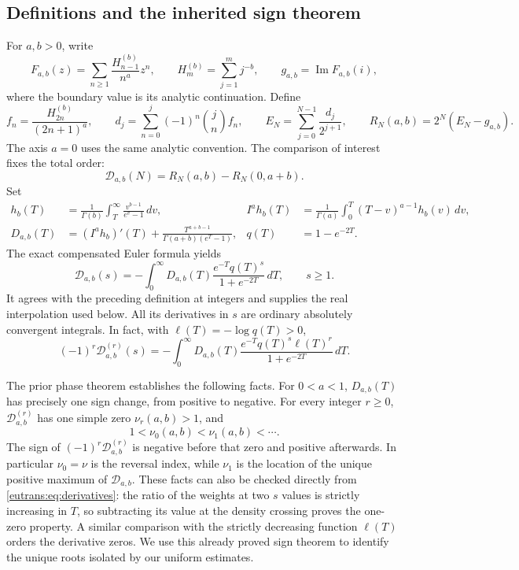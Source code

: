 \documentclass[11pt,a4paper]{article}
\numberwithin{equation}{section}
\theoremstyle{definition}
\theoremstyle{remark}
\begin{document}
\subsection{Definitions and the inherited sign theorem}

For $a,b>0$, write
\[
 F_{a,b}(z)=\sum_{n\geq1}\frac{H_{n-1}^{(b)}}{n^a}z^n,
 \qquad H_m^{(b)}=\sum_{j=1}^m j^{-b},
 \qquad g_{a,b}=\operatorname{Im}F_{a,b}(i),
\]
where the boundary value is its analytic continuation. Define
\[
 f_n=\frac{H_{2n}^{(b)}}{(2n+1)^a},\qquad
 d_j=\sum_{n=0}^j(-1)^n\binom jn f_n,\qquad
 E_N=\sum_{j=0}^{N-1}\frac{d_j}{2^{j+1}},\qquad
 R_N(a,b)=2^N(E_N-g_{a,b}).
\]
The axis $a=0$ uses the same analytic convention. The comparison of
interest fixes the total order:
\[
 \mathcal D_{a,b}(N)=R_N(a,b)-R_N(0,a+b).
\]
Set
\begin{align}
 h_b(T)&=\frac1{\Gamma(b)}\int_T^\infty
                    \frac{v^{b-1}}{e^v-1}\,dv,
 & I^ah_b(T)&=\frac1{\Gamma(a)}\int_0^T(T-v)^{a-1}h_b(v)\,dv,
 \label{eutrans:eq:seed}\\
 D_{a,b}(T)&=(I^ah_b)'(T)
              +\frac{T^{a+b-1}}{\Gamma(a+b)(e^T-1)},
 & q(T)&=1-e^{-2T}.
 \label{eutrans:eq:density}
\end{align}
The exact compensated Euler formula yields
\begin{equation}\label{eutrans:eq:interpolation}
 \mathcal D_{a,b}(s)=-\int_0^\infty D_{a,b}(T)
          \frac{e^{-T}q(T)^s}{1+e^{-2T}}\,dT,
 \qquad s\geq1.
\end{equation}
It agrees with the preceding definition at integers and supplies the
real interpolation used below. All its derivatives in $s$ are ordinary
absolutely convergent integrals. In fact, with
$\ell(T)=-\log q(T)>0$,
\begin{equation}\label{eutrans:eq:derivatives}
 (-1)^r\mathcal D_{a,b}^{(r)}(s)
 =-\int_0^\infty D_{a,b}(T)
    \frac{e^{-T}q(T)^s\ell(T)^r}{1+e^{-2T}}\,dT.
\end{equation}

The prior phase theorem \cite{RepoEuler} establishes the following facts. For $0<a<1$,
$D_{a,b}(T)$ has precisely one sign change, from positive to negative.
For every integer $r\geq0$, $\mathcal D_{a,b}^{(r)}$ has one simple
zero $\nu_r(a,b)>1$, and
\[
 1<\nu_0(a,b)<\nu_1(a,b)<\cdots.
\]
The sign of $(-1)^r\mathcal D_{a,b}^{(r)}$ is negative before that
zero and positive afterwards. In particular $\nu_0=\nu$ is the
reversal index, while $\nu_1$ is the location of the unique positive
maximum of $\mathcal D_{a,b}$. These facts can also be checked directly from
\eqref{eutrans:eq:derivatives}: the ratio of the weights at two $s$
values is strictly increasing in $T$, so subtracting its value at the
density crossing proves the one-zero property. A similar comparison
with the strictly decreasing function $\ell(T)$ orders the derivative
zeros. We use this already proved sign theorem to identify the unique
roots isolated by our uniform estimates.
\end{document}
